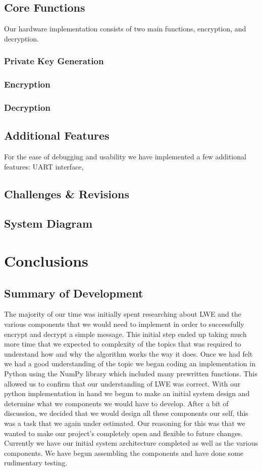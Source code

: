 \documentclass{article}
\begin{document}
\subsection{Core Functions}
Our hardware implementation consists of two main functions, encryption, and decryption. 
\subsubsection{Private Key Generation}
\subsubsection{Encryption}
\subsubsection{Decryption}
\subsection{Additional Features}
For the ease of debugging and usability we have implemented a few additional features: UART interface,
\
\subsection{Challenges \& Revisions }
\subsection{System Diagram}

\section{Conclusions}
\subsection{Summary of Development}
The majority of our time was initially spent researching about LWE and the various components that we would need to implement in order to successfully encrypt and decrypt a simple message. This initial step ended up taking much more time that we expected to complexity of the topics that was required to understand how and why the algorithm works the way it does. Once we had felt we had a good understanding of the topic we began coding an implementation in Python using the NumPy library which included many prewritten functions. This allowed us to confirm that our understanding of LWE was correct.
With our python implementation in hand we begun to make an initial system design and determine what we components we would have to develop. After a bit of discussion, we decided that we would design all these components our self, this was a task that we again under estimated. Our reasoning for this was that we wanted to make our project’s completely open and flexible to future changes. Currently we have our initial system architecture completed as well as the various components. We have begun assembling the components and have done some rudimentary testing.
\end{document}

